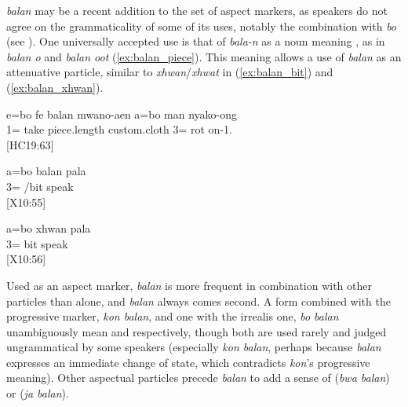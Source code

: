 \textit{balan} may be a recent addition to the set of aspect markers, as speakers do not agree on the grammaticality of some of its uses, notably the combination with \textit{bo} (see ). One universally accepted use is that of \textit{bala-n} as a noun meaning , as in \textit{balan o}  and \textit{balan oot}  (\ref{ex:balan_piece}). This  meaning allows a use of \textit{balan} as an attenuative particle, similar to \textit{xhwan}\slash\textit{xhwat} in (\ref{ex:balan_bit}) and (\ref{ex:balan_xhwan}). 
 
 \ea
 \label{ex:balan_piece}
 \gll  e=bo fe balan mwano-aen a=bo man nyako-ong\\
  1= take piece.length custom.cloth 3= rot on-1.\\
 \glt {} {[HC19:63]}
 \z
 
 
 \ea\label{ex:balan_bit}
 \gll a=bo balan pala\\
  3= /bit speak\\
 \glt {} {[X10:55]}
 \z
 
 \ea\label{ex:balan_xhwan}
 \gll a=bo xhwan pala\\
  3= bit speak\\
 \glt {} {[X10:56]}
 \z
 

 Used as an aspect marker, \textit{balan} is more frequent in combination with other particles than alone, and \textit{balan} always comes second. A form combined with the progressive marker, \textit{kon balan}, and one with the irrealis one, \textit{bo balan} unambiguously mean  and  respectively, though both are used rarely and judged ungrammatical by some speakers (especially \textit{kon balan}, perhaps because \textit{balan} expresses an immediate change of state, which contradicts \textit{kon}'s progressive meaning). Other aspectual particles precede \textit{balan} to add a sense of  (\textit{bwa balan}) or  (\textit{ja balan}). 
 
